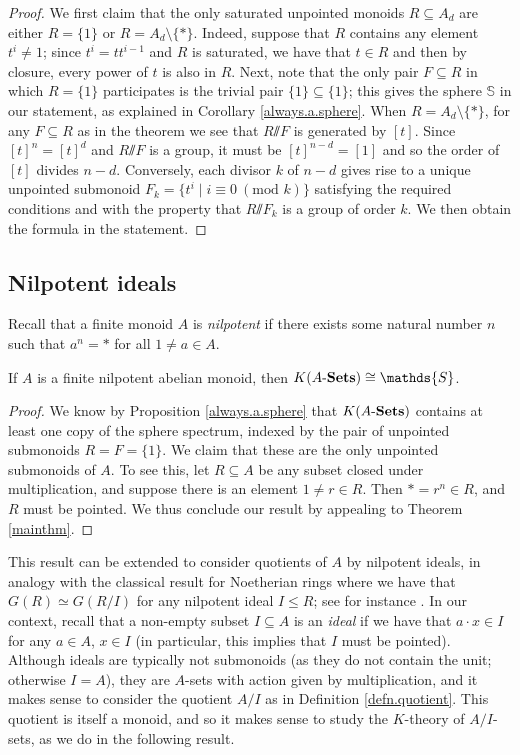 \documentclass[11pt]{amsart}
\renewcommand{\ss}{\mathord{\sslash}}
\begin{document}
\begin{proof}
We first claim that the only saturated unpointed monoids $R\subseteq A_d$ are either $R=\{1\}$ or $R=A_d\setminus\{*\}$. Indeed, suppose that $R$ contains any element $t^i\neq 1$; since $t^i=tt^{i-1}$ and $R$ is saturated, we have that $t\in R$ and then by closure, every power of $t$ is also in $R$. Next, note that the only pair $F\subseteq R$ in which $R=\{1\}$ participates is the trivial pair $\{1\}\subseteq\{1\}$; this gives the sphere $\mathds{S}$ in our statement, as explained in Corollary  \ref{always.a.sphere}. When $R=A_d\setminus\{*\}$, for any $F\subseteq R$ as in the theorem we see that $R\ss F$ is generated by $[t]$. Since $[t]^n=[t]^d$ and $R\ss F$ is a group, it must be $[t]^{n-d}=[1]$ and so the order of $[t]$ divides $n-d$. Conversely, each divisor $k$ of $n-d$ gives rise to a unique unpointed submonoid $F_k=\{t^i \mid i\equiv 0 \ (\text{mod } k)\}$ satisfying the required conditions and with the property that $R\ss F_k$ is a group of order $k$. We then obtain the formula in the statement. 
\end{proof}

\subsection{Nilpotent ideals}
 Recall that a finite monoid $A$ is \emph{nilpotent} if there exists some natural number $n$ such that $a^n=*$ for all $1\neq a\in A$.  

 \begin{lemma}\label{nilpotent}
     If $A$ is a finite nilpotent abelian monoid, then $K(\ASets)\cong\mathds{S}$.  
 \end{lemma}
 \begin{proof}
     We know by Proposition \ref{always.a.sphere} that $K(A\text{-}\mathbf{Sets})$ contains at least one copy of the sphere spectrum, indexed by the pair of unpointed submonoids $R=F=\{1\}$. We claim that these are the only unpointed submonoids of $A$. To see this, let $R\subseteq A$ be any subset closed under multiplication, and suppose there is an element $1\neq r\in R$. Then $*=r^n\in R$, and $R$ must be pointed. We thus conclude our result by appealing to Theorem \ref{mainthm}. 
 \end{proof}

 This result can be extended to consider quotients of $A$ by nilpotent ideals, in analogy with the classical result for Noetherian rings where we have that $G(R)\simeq G(R/I)$ for any nilpotent ideal $I\leq R$; see for instance \cite[Corollary V.4.2]{weibel_kbook}. In our context, recall that a non-empty subset $I\subseteq A$ is an \emph{ideal} if we have that $a\cdot x\in I$ for any $a\in A$, $x\in I$ (in particular, this implies that $I$ must be pointed). Although ideals are typically not submonoids (as they do not contain the unit; otherwise $I=A$), they are $A$-sets with action given by multiplication, and it makes sense to consider the quotient $A/I$ as in Definition \ref{defn.quotient}. This quotient is itself a monoid, and so it makes sense to study the $K$-theory of $A/I$-sets, as we do in the following result. 
\end{document}
